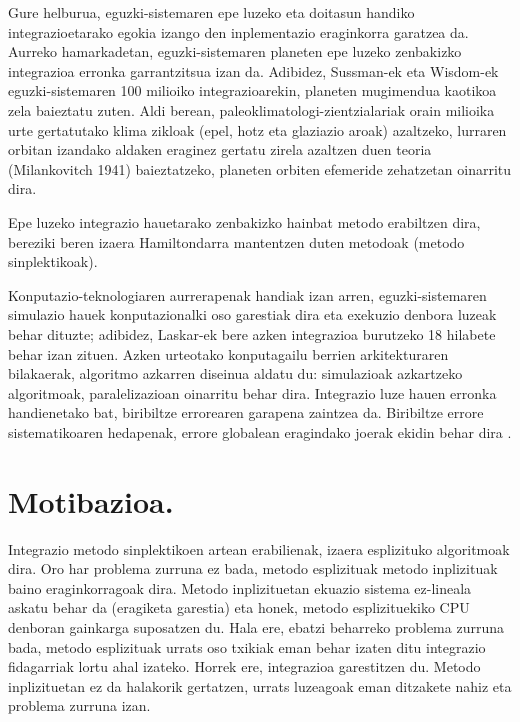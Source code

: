Gure helburua, eguzki-sistemaren epe luzeko eta doitasun handiko integrazioetarako egokia izango den inplementazio eraginkorra garatzea da. Aurreko hamarkadetan, eguzki-sistemaren planeten epe luzeko zenbakizko integrazioa erronka garrantzitsua izan da. Adibidez, Sussman-ek eta Wisdom-ek  eguzki-sistemaren 100 milioiko integrazioarekin, planeten mugimendua kaotikoa zela baieztatu zuten. Aldi berean, paleoklimatologi-zientzialariak orain milioika urte gertatutako klima zikloak (epel, hotz eta glaziazio aroak) azaltzeko, lurraren orbitan izandako aldaken eraginez gertatu zirela azaltzen duen teoria (Milankovitch 1941) \cite{Berger2012} baieztatzeko, planeten orbiten efemeride zehatzetan oinarritu dira.        

Epe luzeko integrazio hauetarako zenbakizko hainbat metodo erabiltzen dira, bereziki beren izaera Hamiltondarra mantentzen duten metodoak (metodo sinplektikoak).

Konputazio-teknologiaren aurrerapenak handiak izan arren, eguzki-sistemaren simulazio hauek konputazionalki oso garestiak dira eta exekuzio denbora luzeak behar dituzte; adibidez, Laskar-ek  bere azken integrazioa burutzeko 18 hilabete behar izan zituen.
Azken urteotako konputagailu berrien arkitekturaren bilakaerak, algoritmo azkarren diseinua aldatu du: simulazioak azkartzeko algoritmoak, paralelizazioan oinarritu behar dira. Integrazio luze hauen erronka handienetako bat, biribiltze errorearen garapena zaintzea da. Biribiltze errore sistematikoaren hedapenak, errore globalean eragindako joerak ekidin behar dira \cite{Laskar2015}.
 
\section{Motibazioa.}
\label{intro}


Integrazio metodo sinplektikoen artean erabilienak, izaera esplizituko algoritmoak dira. Oro har problema zurruna ez bada, metodo esplizituak  metodo inplizituak baino eraginkorragoak dira. Metodo inplizituetan ekuazio sistema ez-lineala askatu behar da (eragiketa garestia) eta honek, metodo esplizituekiko CPU denboran gainkarga suposatzen du. Hala ere, ebatzi beharreko problema zurruna bada, metodo esplizituak urrats oso txikiak eman behar izaten ditu integrazio fidagarriak lortu ahal izateko. Horrek ere, integrazioa garestitzen du. Metodo inplizituetan ez da halakorik gertatzen, urrats luzeagoak eman ditzakete nahiz eta problema zurruna izan. 

